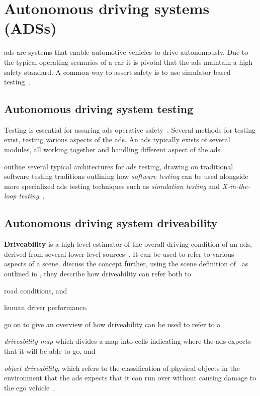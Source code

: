 \section{Autonomous driving systems (ADSs)}

\acrfull{ads} are systems that enable automotive vehicles to drive autonomously. Due to the typical
operating scenarios of a car it is pivotal that the \acrlong{ads} maintain a high safety standard. A
common way to assert safety is to use simulator based testing~\cite[1]{DeepScenario}.

\subsection{Autonomous driving system testing}

Testing is essential for assuring \acrlong{ads} operative safety~\cite[163]{ADTestingReview16}.
Several methods for testing exist, testing various aspects of the \acrlong{ads}. An \acrshort{ads}
typically exists of several modules, all working together and handling different aspect of the
\acrlong{ads}.

\citeauthor{ADTestingReview16} outline several typical architectures for \acrshort{ads} testing,
drawing on traditional software testing traditions outlining how \textit{software testing} can be
used alongside more specialized \acrshort{ads} testing techniques such as \textit{simulation
    testing} and \textit{X-in-the-loop testing}~\cite[163-164]{ADTestingReview16}.

\subsection{Autonomous driving system driveability}\label{sec:adsDrivability}

\textbf{Driveability} is a high-level estimator of the overall driving
condition of an \acrshort{ads}, derived from several lower-level sources~\cite[3140]{safeToDrive}.
It can be used to refer to various aspects of a scene.
\citeauthor{safeToDrive} discuss the concept further, using the  scene definition
of~\citeauthor{scenes} as outlined in  , they describe
how driveability can refer both to \begin{inparaenum}
    \item road conditions, and
    \item human driver performance.
\end{inparaenum}
\citeauthor{safeToDrive} go on to give an overview of how driveability
can be used to refer to a \begin{inparaenum}\setcounter{enumi}{2}
    \item \textit{driveability map} which divides a map into
    cells indicating where the \acrshort{ads} expects that it will be able to go, and
    \item \textit{object driveability}, which refers to the classification of physical objects in
    the environment that the \acrshort{ads} expects that it can run over without causing damage to
    the ego vehicle~\cite[3135-3136]{safeToDrive}.
\end{inparaenum}

